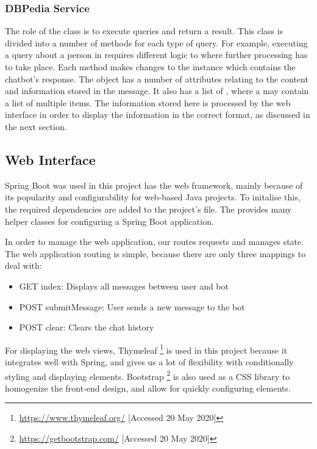 \subsubsection{DBPedia Service}
The role of the  class is to execute queries and return a result. This class is divided into a number of methods for each type of query. For example, executing a query about a person in  requires different logic to  where further processing has to take place. Each method makes changes to the  instance which contains the chatbot's response. The  object has a number of attributes relating to the content and information stored in the message. It also has a list of , where a  may contain a list of multiple items. The information stored here is processed by the web interface in order to display the information in the correct format, as discussed in the next section.

\subsection{Web Interface}
Spring Boot \cite{springmanual} was used in this project has the web framework, mainly because of its popularity and configurability for web-based Java projects. To initalise this, the required dependencies are added to the project's  file. The  provides many helper classes for configuring a Spring Boot application.

In order to manage the web application, our  routes requests and manages state. The web application routing is simple, because there are only three mappings to deal with:
\begin{itemize}
	\item GET index: Displays all messages between user and bot
	\item POST submitMessage: User sends a new message to the bot
	\item POST clear: Clears the chat history
\end{itemize}

For displaying the web views, Thymeleaf \footnote{\url{https://www.thymeleaf.org/} [Accessed 20 May 2020]} is used in this project because it integrates well with Spring, and gives us a lot of flexibility with conditionally styling and displaying elements. Bootstrap \footnote{\url{https://getbootstrap.com/} [Accessed 20 May 2020]} is also used as a CSS library to homogenize the front-end design, and allow for quickly configuring elements.

